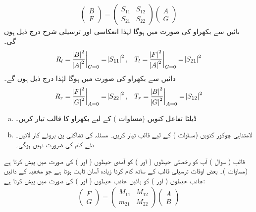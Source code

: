 \begin{align}\label{مساوات_غیر_تابع_شروڈنگر_قالب_بکھراو_بی_ایف}
	\begin{pmatrix}
		B\\
		F
	\end{pmatrix}
	=
	\begin{pmatrix}
		S_{11} & S_{12}\\
		S_{21} & S_{22}
	\end{pmatrix}
	\begin{pmatrix}
		A\\
		G
	\end{pmatrix}
\end{align}
بائیں سے بکھراو کی صورت میں  ہوگا لہٰذا انعکاسی اور ترسیلی شرح درج ذیل ہوں گی۔
\begin{align}\label{مساوات_غیر_تابع_شروڈنگر_آر_ایس}
	R_l=\frac{\abs{B}^2}{\abs{A}^2}\bigg|_{G=0}=\abs{S_{11}}^2,&& T_l=\frac{\abs{F}^2}{\abs{A}^2}\bigg|_{G=0}=\abs{S_{21}}^2
\end{align}
دائیں سے بکھراو کی صورت میں  ہوگا لہٰذا درج ذیل ہوں گے۔
\begin{align}\label{مساوات_غیر_تابع_شروڈنگر_آر_ٹی}
	R_r=\frac{\abs{F}^2}{\abs{G}^2}\bigg|_{A=0}=\abs{S_{22}}^2,&& T_r=\frac{\abs{B}^2}{\abs{G}^2}\bigg|_{A=0}=\abs{S_{12}}^2
\end{align}
%
\begin{enumerate}[a.]
\item
 ڈیلٹا تفاعل کنویں (مساوات ) کے لیے بکھراو کا قالب  تیار کریں۔
\item
 لامتناہی چوکور کنویں (مساوات ) کے لیے قالب  تیار کریں۔  مسئلہ کی تشاکلی پن بروئے کار لائیں۔ نئے کام کی ضرورت نہیں ہوگی۔ 
\end{enumerate}
 قالب ( سوال ) آپ کو رخصتی حیطوں (  اور ) کو آمدی حیطوں ( اور ) کی صورت میں پیش کرتا ہے (مساوات )۔ بعض اوقات ترسیلی قالب  کے ساتھ کام کرنا زیادہ آسان ثابت ہوتا ہے جو مخفیہ کے دائیں جانب حیطوں ( اور ) کو بائیں جانب حیطوں ( اور ) کی صورت میں پیش کرتا ہے:
\begin{align}
	\begin{pmatrix}
		F\\
		G
	\end{pmatrix}
	=
	\begin{pmatrix}
		M_{11} & M_{12} \\
		m_{21} & M_{22}
	\end{pmatrix}
	\begin{pmatrix}
		A\\
		B
	\end{pmatrix}
\end{align}
